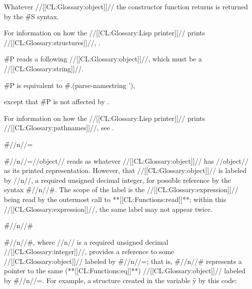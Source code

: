 Whatever //[[CL:Glossary:object]]// the constructor function returns
is returned by the \f{\#S} syntax.

For information on how the //[[CL:Glossary:Lisp printer]]// prints //[[CL:Glossary:structures]]//,
\seesection\PrintingStructures.

\endsubsubsection%



\f{\#P} reads a following //[[CL:Glossary:object]]//, which must be a //[[CL:Glossary:string]]//.



\f{\#P} is equivalent to 
\f{\#.(parse-namestring ')},

except that \f{\#P} is not affected by .

For information on how the //[[CL:Glossary:Lisp printer]]// prints //[[CL:Glossary:pathnames]]//,
see \secref\PrintingPathnames.



\endsubsubsection%



\f{\#//n//=}

\f{\#//n//=//object//} reads as whatever //[[CL:Glossary:object]]//
has //object// as its printed representation.  However, that //[[CL:Glossary:object]]//
is labeled by //n//, a required unsigned decimal integer, for
possible reference by the syntax \f{\#//n//\#}.
The scope of the label is the //[[CL:Glossary:expression]]// being read by the outermost
call to **[[CL:Functions:read]]**; within this //[[CL:Glossary:expression]]//,
the same label may not appear twice.

\endsubsubsection%



\f{\#//n//\#}
 
\f{\#//n//\#}, where //n// is a required unsigned decimal
//[[CL:Glossary:integer]]//,
provides a reference to some //[[CL:Glossary:object]]// labeled by \f{\#//n//=};
that is, \f{\#//n//\#} represents a pointer to the same 
(**[[CL:Functions:eq]]**) //[[CL:Glossary:object]]// labeled by \f{\#//n//=}.
For example, a structure created in the variable \f{y} by this code:

